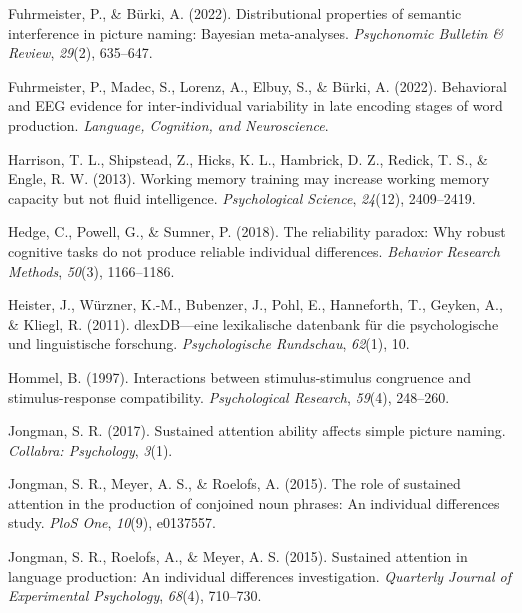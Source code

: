 \documentclass[
  man,floatsintext]{apa6}
\newlength{\cslhangindent}
\newlength{\cslentryspacingunit} %
\newenvironment{CSLReferences}[2] %
 {%
  \setlength{\parindent}{0pt}
  \ifodd #1
  \let\oldpar\par
  \def\par{\hangindent=\cslhangindent\oldpar}
  \fi
  \setlength{\parskip}{#2\cslentryspacingunit}
 }%
 {}
\begin{document}
\begin{CSLReferences}{1}{0}
\leavevmode{}%
Fuhrmeister, P., \& Bürki, A. (2022). Distributional properties of semantic interference in picture naming: Bayesian meta-analyses. \emph{Psychonomic Bulletin \& Review}, \emph{29}(2), 635--647.

\leavevmode{}%
Fuhrmeister, P., Madec, S., Lorenz, A., Elbuy, S., \& Bürki, A. (2022). Behavioral and EEG evidence for inter-individual variability in late encoding stages of word production. \emph{Language, Cognition, and Neuroscience}.

\leavevmode{}%
Harrison, T. L., Shipstead, Z., Hicks, K. L., Hambrick, D. Z., Redick, T. S., \& Engle, R. W. (2013). Working memory training may increase working memory capacity but not fluid intelligence. \emph{Psychological Science}, \emph{24}(12), 2409--2419.

\leavevmode{}%
Hedge, C., Powell, G., \& Sumner, P. (2018). The reliability paradox: Why robust cognitive tasks do not produce reliable individual differences. \emph{Behavior Research Methods}, \emph{50}(3), 1166--1186.

\leavevmode{}%
Heister, J., Würzner, K.-M., Bubenzer, J., Pohl, E., Hanneforth, T., Geyken, A., \& Kliegl, R. (2011). dlexDB---eine lexikalische datenbank f{ü}r die psychologische und linguistische forschung. \emph{Psychologische Rundschau}, \emph{62}(1), 10.

\leavevmode{}%
Hommel, B. (1997). Interactions between stimulus-stimulus congruence and stimulus-response compatibility. \emph{Psychological Research}, \emph{59}(4), 248--260.

\leavevmode{}%
Jongman, S. R. (2017). Sustained attention ability affects simple picture naming. \emph{Collabra: Psychology}, \emph{3}(1).

\leavevmode{}%
Jongman, S. R., Meyer, A. S., \& Roelofs, A. (2015). The role of sustained attention in the production of conjoined noun phrases: An individual differences study. \emph{PloS One}, \emph{10}(9), e0137557.

\leavevmode{}%
Jongman, S. R., Roelofs, A., \& Meyer, A. S. (2015). Sustained attention in language production: An individual differences investigation. \emph{Quarterly Journal of Experimental Psychology}, \emph{68}(4), 710--730.


\end{CSLReferences}
\end{document}
